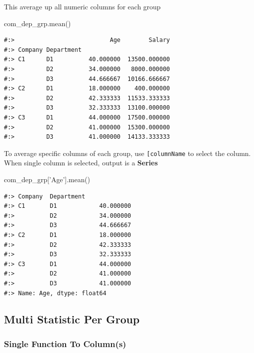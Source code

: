\documentclass[
]{book}
\newenvironment{Shaded}{\begin{snugshade}}{\end{snugshade}}
\newcommand{\NormalTok}[1]{#1}
\newcommand{\StringTok}[1]{\textcolor[rgb]{0.5,0.5,0.5}{#1}}
\begin{document}
This average up all numeric columns for each group

\begin{Shaded}
\begin{Highlighting}[]
\NormalTok{com_dep_grp.mean()}
\end{Highlighting}
\end{Shaded}

\begin{verbatim}
#:>                           Age        Salary
#:> Company Department                         
#:> C1      D1          40.000000  13500.000000
#:>         D2          34.000000   8000.000000
#:>         D3          44.666667  10166.666667
#:> C2      D1          18.000000    400.000000
#:>         D2          42.333333  11533.333333
#:>         D3          32.333333  13100.000000
#:> C3      D1          44.000000  17500.000000
#:>         D2          41.000000  15300.000000
#:>         D3          41.000000  14133.333333
\end{verbatim}

To average specific columns of each group, use \texttt{{[}\textquotesingle{}columnName\textquotesingle{}{]}} to select the column.\\
When single column is selected, output is a \textbf{Series}

\begin{Shaded}
\begin{Highlighting}[]
\NormalTok{com_dep_grp[}\StringTok{'Age'}\NormalTok{].mean()}
\end{Highlighting}
\end{Shaded}

\begin{verbatim}
#:> Company  Department
#:> C1       D1            40.000000
#:>          D2            34.000000
#:>          D3            44.666667
#:> C2       D1            18.000000
#:>          D2            42.333333
#:>          D3            32.333333
#:> C3       D1            44.000000
#:>          D2            41.000000
#:>          D3            41.000000
#:> Name: Age, dtype: float64
\end{verbatim}

\hypertarget{multi-statistic-per-group}{%
\subsection{Multi Statistic Per Group}\label{multi-statistic-per-group}}

\hypertarget{single-function-to-columns}{%
\subsubsection{Single Function To Column(s)}\label{single-function-to-columns}}
\end{document}
